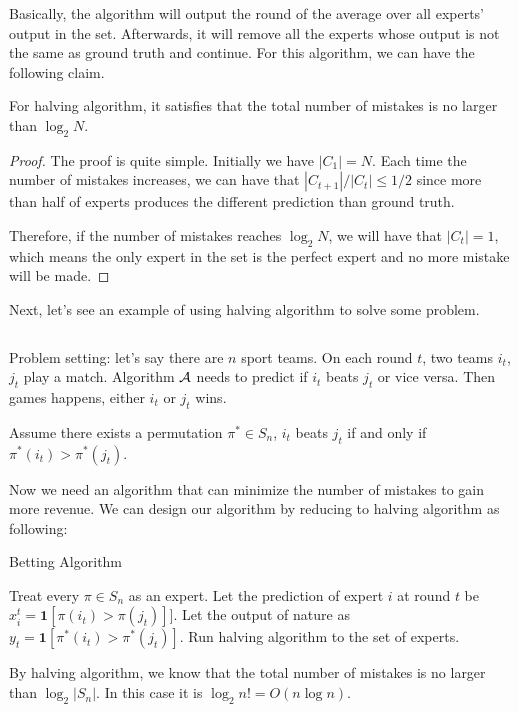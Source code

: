 \documentclass[../main.tex]{subfiles}
\begin{document}
Basically, the algorithm will output the round of the average over all experts' output in the set. Afterwards, it will remove all the experts whose output is not the same as ground truth and continue. For this algorithm, we can have the following claim.

\begin{claim}
	For halving algorithm, it satisfies that the total number of mistakes is no larger than $\log_2 N$.
\end{claim}

\begin{proof}
	The proof is quite simple. Initially we have $|C_1| = N$. Each time the number of mistakes increases, we can have that $|C_{t+1}| / |C_t| \leq 1 / 2$ since more than half of experts produces the different prediction than ground truth.
	
	Therefore, if the number of mistakes reaches $\log_2 N$, we will have that $|C_t| = 1$, which means the only expert in the set is the perfect expert and no more mistake will be made.
\end{proof}

Next, let's see an example of using halving algorithm to solve some problem.

\begin{example}$ $
	
	Problem setting: let's say there are $n$ sport teams. On each round $t$, two teams $i_t$, $j_t$ play a match. Algorithm $\mathcal{A}$ needs to predict if $i_t$ beats $j_t$ or vice versa. Then games happens, either $i_t$ or $j_t$ wins.
	
	Assume there exists a permutation $\pi^* \in S_n$, $i_t$ beats $j_t$ if and only if $\pi^*(i_t) > \pi^*(j_t)$.
	
	Now we need an algorithm that can minimize the number of mistakes to gain more revenue. We can design our algorithm by reducing to halving algorithm as following:
	
\begin{algorithm}[H]
	\caption{Betting Algorithm}
	\begin{algorithmic}
		\STATE Treat every $\pi \in S_n$ as an expert.
		\STATE Let the prediction of expert $i$ at round $t$ be $x^t_{i} = \mathbf{1}[\pi(i_t) > \pi(j_t)]]$.
		\STATE Let the output of nature as $y_t = \mathbf{1}[\pi^*(i_t) > \pi^*(j_t)]$.
		\STATE Run halving algorithm to the set of experts.
	\end{algorithmic}
\end{algorithm}
	
	By halving algorithm, we know that the total number of mistakes is no larger than $\log_2 |S_n|$. In this case it is $\log_2 n! = O(n\log n)$.
\end{example}
\end{document}
